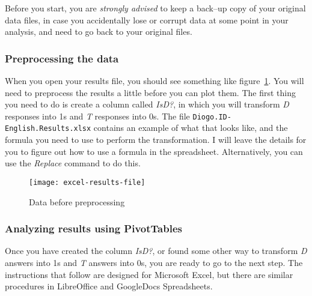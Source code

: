 \documentclass{article}
\newcommand{\soft}[1]{\textsf{#1}}
\newcommand{\filefmat}[1]{\texttt{#1}}
\newcommand{\MSExcel}{\soft{Microsoft\texttrademark{} Excel}}
\newcommand{\OpOff}{\soft{LibreOffice}}
\newcommand{\GDocs}{\soft{GoogleDocs Spreadsheets}}
\begin{document}
Before you start, you are \emph{strongly advised} to keep a back--up copy of your original data files, in case you accidentally lose or corrupt data at some point in your analysis, and need to go back to your original files.

\subsubsection{Preprocessing the data}

When you open your results file, you should see something like figure~\ref{excel-results-file}. You will need to preprocess the results a little before you can plot them. The first thing you need to do is create a column called \emph{IsD?}, in which you will transform \emph{D} responses into 1s and \emph{T} responses into 0s. The file \filefmat{Diogo.ID-English.Results.xlsx} contains an example of what that looks like, and the formula you need to use to perform the transformation. I will leave the details for you to figure out how to use a formula in the spreadsheet. Alternatively, you can use the \emph{Replace} command to do this.

\begin{figure}[!tbp]
\caption{Data before preprocessing}
\label{excel-results-file}
	\begin{center}
		\texttt{[image: excel-results-file]}
	\end{center}
\end{figure}

\subsubsection{Analyzing results using PivotTables}

Once you have created the column \emph{IsD?}, or found some other way to transform \emph{D} answers into 1s and \emph{T} answers into 0s, you are ready to go to the next step. The instructions that follow are designed for \MSExcel{}, but there are similar procedures in \OpOff{} and \GDocs{}.
\end{document}
